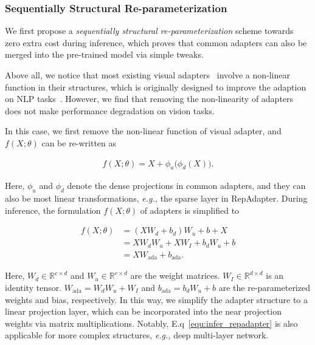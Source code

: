 \subsubsection{ Sequentially Structural  Re-parameterization} We first propose a \emph{sequentially structural  re-parameterization} scheme towards zero extra cost during inference, which proves that common adapters can also be merged into the pre-trained model via simple tweaks.

 Above all, we notice that most  existing   visual adapters~\cite{vladapter,adaptformer}   involve a non-linear function in their structures, which is originally designed to improve the adaption on NLP tasks~\cite{adapter}.   However, we find that removing the non-linearity of adapters does not make performance degradation on vision tasks.   

 In this case, we first remove the non-linear function of visual adapter,  and  $f(X;\theta)$   can be re-written as

\begin{equation}
\label{equ:repadapter}
\begin{aligned} 
f(X;\theta)=X+ \phi_u\big(\phi_d(X)\big).
\end{aligned}
\end{equation}

Here, $\phi_u$ and $\phi_d$ denote the  dense   projections in  common adapters, and they  can also be  most linear transformations, \emph{e.g.,}     the sparse layer  in RepAdapter.  During inference, the formulation $f(X;\theta)$ of adapters  is simplified  to

\begin{equation}
\label{equ:infer_repadapter}
\begin{aligned}
 f(X;\theta)&= (XW_d+b_d)W_u+b+X\\
 &=XW_dW_u+XW_I+b_dW_u+b\\ 
 &=XW_{\text{ada}}+b_{\text{ada}}.
\end{aligned}

\end{equation}

Here, $W_d \in \mathbb{R}^{c\times d}$ and $W_u\in \mathbb{R}^{c\times d}$ are the weight matrices.  $W_I \in \mathbb{R}^{d\times d}$ is an identity  tensor.   $W_{\text{ada}}=W_dW_u+W_I$  and $b_{\text{ada}}=b_dW_u+b$ are the re-parameterized weights and bias, respectively.     In this way, we simplify the adapter structure  to a linear projection  layer, which can be incorporated into the near projection weights via matrix multiplications. Notably, E.q~\ref{equ:infer_repadapter} is also applicable  for more complex structures, \emph{e.g.,} deep multi-layer network.

